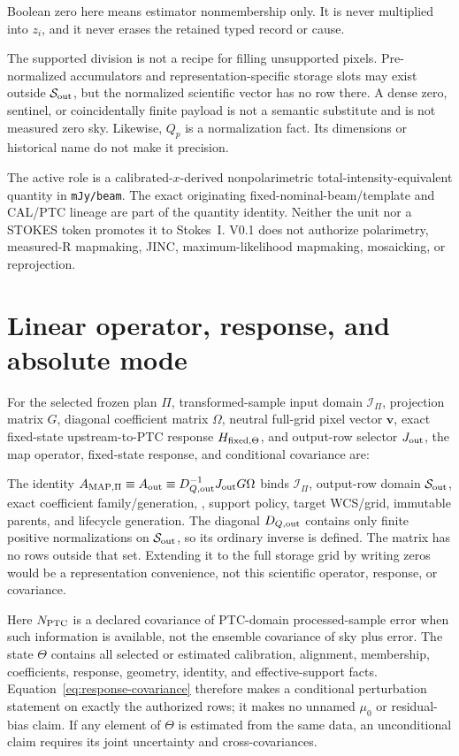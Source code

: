 \documentclass[10pt]{article}
\newcommand{\code}[1]{\nolinkurl{#1}}
\begin{document}
Boolean zero here means estimator nonmembership only. It is never multiplied
into \(z_i\), and it never erases the retained typed record or cause.

The supported division is not a recipe for filling unsupported pixels.
Pre-normalized accumulators and representation-specific storage slots may exist outside
\(\mathcal S_{\rm out}\), but the normalized scientific vector has no row
there. A dense zero, sentinel, or coincidentally finite payload is not a
semantic substitute and is not measured zero sky. Likewise, \(Q_p\) is a
normalization fact. Its dimensions or historical name do not make it
precision.

The active role is a calibrated-\(x\)-derived nonpolarimetric
total-intensity-equivalent quantity in \code{mJy/beam}. The exact originating
fixed-nominal-beam/template and CAL/PTC lineage are part of the quantity
identity. Neither the unit nor a STOKES token promotes it to Stokes~I. V0.1
does not authorize polarimetry, measured-R mapmaking, JINC,
maximum-likelihood mapmaking, mosaicking, or reprojection.

\clearpage
\section{Linear operator, response, and absolute mode}

For the selected frozen plan \(\Pi\), transformed-sample input domain
\(\mathcal I_\Pi\), projection matrix \(G\), diagonal coefficient matrix
\(\Omega\), neutral full-grid pixel vector \(\boldsymbol v\), exact fixed-state
upstream-to-PTC response \(H_{{\rm fixed},\Theta}\), and output-row selector
\(J_{\rm out}\), the map operator, fixed-state response, and conditional
covariance are:

\SCIMapOperatorEquations

The identity \(A_{{\rm MAP},\Pi}\equiv A_{\rm out}\equiv
D_{Q,{\rm out}}^{-1}J_{\rm out}G\Omega\) binds \(\mathcal I_\Pi\), output-row
domain \(\mathcal S_{\rm out}\), exact coefficient family/generation,
\SCIMapOneHotProfile, support policy, target WCS/grid,
immutable parents, and lifecycle generation. The diagonal
\(D_{Q,{\rm out}}\) contains only finite positive normalizations
on \(\mathcal S_{\rm out}\), so its ordinary inverse is defined. The matrix
has no rows outside that set. Extending it to the full storage
grid by writing zeros would be a representation convenience, not this
scientific operator, response, or covariance.

Here \(N_{\rm PTC}\) is a declared covariance of PTC-domain processed-sample
error when such information is available, not the ensemble
covariance of sky plus error. The state \(\Theta\) contains all selected or
estimated calibration, alignment, membership, coefficients, response,
geometry, identity, and effective-support facts.
Equation~\eqref{eq:response-covariance} therefore makes a conditional
perturbation statement on exactly the authorized rows; it makes no unnamed
\(\mu_0\) or residual-bias claim. If any element of \(\Theta\) is
estimated from the same data, an unconditional claim requires its joint
uncertainty and cross-covariances.
\end{document}
